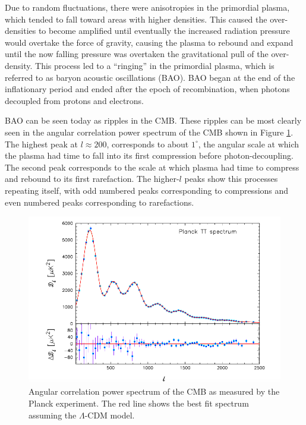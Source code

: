 Due to random fluctuations, there were anisotropies in the primordial plasma, which tended to fall toward areas with higher densities. This caused the over-densities to become amplified until eventually the increased radiation pressure would overtake the force of gravity, causing the plasma to rebound and expand until the now falling pressure was overtaken the gravitational pull of the over-density. This process led to a ``ringing'' in the primordial plasma, which is referred to as baryon acoustic oscillations (BAO). BAO began at the end of the inflationary period and ended after the epoch of recombination, when photons decoupled from protons and electrons. 

BAO can be seen today as ripples in the CMB. These ripples can be most clearly seen in the angular correlation power spectrum of the CMB shown in Figure \ref{fig:powerspectrum}. The highest peak at $l \approx 200$, corresponds to about $1^{\circ}$, the angular scale at which the plasma had time to fall into its first compression before photon-decoupling. The second peak corresponds to the scale at which plasma had time to compress and rebound to its first rarefaction. The higher-$l$ peaks show this processes repeating itself, with odd numbered peaks corresponding to compressions and even numbered peaks corresponding to rarefactions. 

\begin{figure}[h!]
\centering
\includegraphics[width=150mm]{Figures/PLANCK_PS_TT}
\caption{Angular correlation power spectrum of the CMB as measured by the Planck experiment. The red line shows the best fit spectrum assuming the $\Lambda$-CDM model. \cite{planck2015}}
\label{fig:powerspectrum} 
\end{figure}


